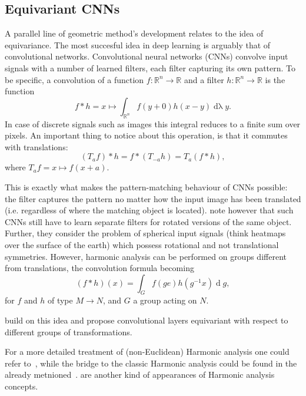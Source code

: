 \subsection{Equivariant CNNs}

A parallel line of geometric method's development relates to the idea of
equivariance. The most succesful idea in deep learning is arguably that of
convolutional networks. Convolutional neural networks (CNNs) convolve
input signals with a number of learned filters, each filter capturing
its own pattern. To be specific, a convolution of a function \( f: \mathbb{R}^n
\to \mathbb{R} \) and a filter \( h: \mathbb{R}^n \to \mathbb{R} \) is the
function~\cite{feichtingerFAHA}
\[ f*h = x \mapsto \int_{\mathbb{R}^n} f(y + 0) h(x-y)
\operatorname{d\lambda} y. \]
In case of discrete signals such as images this
integral reduces to a finite sum over pixels. An important thing to notice
about this operation, is that it commutes with translations:
\[ (T_a f) * h = f * (T_{-a} h) = T_a (f * h), \]
where \( T_a f = x \mapsto f(x + a) \).

This is exactly what makes the pattern-matching behaviour of CNNs possible: the
filter captures the pattern no matter how the input image has been translated
(i.e. regardless of where the matching object is located). \citet{s2cnn} note
however that such CNNs still have to learn separate filters for rotated
versions of the same object. Further, they consider the problem of spherical
input signals (think heatmaps over the surface of the earth) which possess
rotational and not translational symmetries. However, harmonic analysis can be
performed on groups different from translations, the convolution
formula becoming
\[
(f * h)(x) = \int_G f(g e) h(g^{-1}x) \operatorname{d}g,
\]
for \( f \) and \( h \) of type \( M\to N \), and \( G \) a group acting on
\( N \).

\citet{s2cnn,cohen2018general,e2cnn} build on this idea and propose
convolutional layers equivariant with respect to different groups of
transformations.

For a more detailed treatment of (non-Euclidean) Harmonic analysis one could
refer
to~\citet{axlerHarmonic,
explorationsHarmonic,
benedettoHarmonic,
stollharmonic,
terrasHarmonicSymmetric,
terrasHarmonicSymmetric2,
fourierS2},
while the bridge to the classic Harmonic analysis could be found in the already
metnioned~\cite{feichtingerFAHA}.
\citet{eyeRotations,zhou2019glosh,scnnNiessner} are another kind of appearances
of Harmonic analysis concepts.

